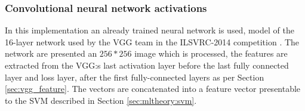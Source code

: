
\subsubsection{Convolutional neural network activations}
\label{sec:meth:featextr:cnn}

In this implementation an already trained neural network is used, model of the 16-layer network used by the VGG team in the ILSVRC-2014 competition \cite{simonyan2014very}. The network are presented an $256*256$ image which is processed, the features are extracted from the VGG:s last activation layer before the last fully connected layer and loss layer, after the first fully-connected layers as per Section \ref{sec:vgg_feature}. The vectors are concatenated into a feature vector presentable to the SVM described in Section \ref{sec:mltheory:svm}. 
